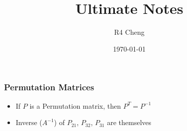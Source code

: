 \documentclass[12pt,a4paper]{article}
\title{Ultimate Notes}
\author{R4 Cheng}
\date{\today}
\begin{document}
\maketitle

\subsubsection*{Permutation Matrices}

\begin{itemize}
  \item If $P$ is a Permutation matrix, then $P^T = P^{-1}$
  \item Inverse ($A^{-1}$) of $P_{21}$, $P_{32}$, $P_{31}$ are themselves 
\end{itemize}
\end{document}
